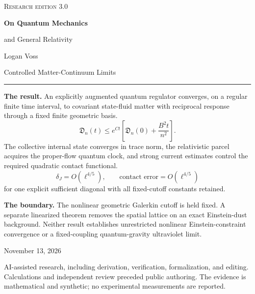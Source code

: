 \documentclass[11pt]{article}
\begin{document}
\hypersetup{pageanchor=false}
\begin{titlepage}
\vspace*{10mm}
{\color{accent}\small\scshape Research edition 3.0}\par\vspace{9mm}
{\color{ink}\Huge\bfseries On Quantum Mechanics\par and General Relativity}\par\vspace{8mm}
{\Large Logan Voss}\par\vspace{8mm}
{\large Controlled Matter-Continuum Limits}\par\vspace{10mm}
\hrule\vspace{6mm}
\textbf{The result.} An explicitly augmented quantum regulator converges, on a regular finite time interval, to covariant state-fluid matter with reciprocal response through a fixed finite geometric basis.
\[
\boxed{\mathfrak D_n(t)\le e^{Ct}
\left[\mathfrak D_n(0)+\frac{B^2t}{n^2}\right].}
\]
The collective internal state converges in trace norm, the relativistic parcel acquires the proper-flow quantum clock, and strong current estimates control the required quadratic contact functional.
\[
\boxed{\delta_J=O(\ell^{4/5}),\qquad
\text{contact error}=O(\ell^{4/5})}
\]
for one explicit sufficient diagonal with all fixed-cutoff constants retained.
\par\vspace{4mm}
\textbf{The boundary.} The nonlinear geometric Galerkin cutoff is held fixed. A separate linearized theorem removes the spatial lattice on an exact Einstein-dust background. Neither result establishes unrestricted nonlinear Einstein-constraint convergence or a fixed-coupling quantum-gravity ultraviolet limit.
\vfill
{\small November 13, 2026\par
AI-assisted research, including derivation, verification, formalization, and editing. Calculations and independent review preceded public authoring. The evidence is mathematical and synthetic; no experimental measurements are reported.}\par
\end{titlepage}
\hypersetup{pageanchor=true}
\end{document}
